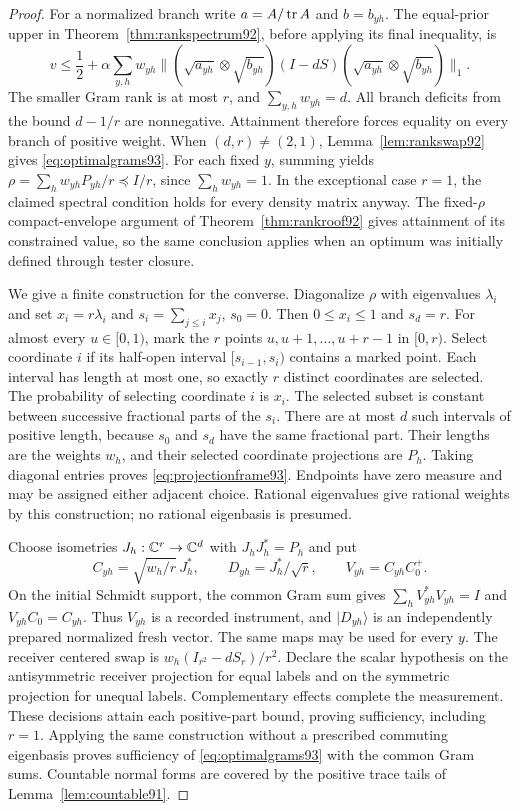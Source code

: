 \begin{proof}
For a normalized branch write $a=A/\operatorname{tr} A$ and $b=b_{yh}$.
The equal-prior upper in Theorem~\ref{thm:rankspectrum92}, before
applying its final inequality, is
\begin{equation}\label{eq:unsaturatedrankupper93}
 v\le\frac12+\alpha\sum_{y,h}w_{yh}
       \| (\sqrt{a_{yh}}\otimes\sqrt{b_{yh}})(I-dS)
                    (\sqrt{a_{yh}}\otimes\sqrt{b_{yh}})\|_1.
\end{equation}
The smaller Gram rank is at most $r$, and $\sum_{y,h}w_{yh}=d$.
All branch deficits from the bound $d-1/r$ are nonnegative.
Attainment therefore forces equality on every branch of positive
weight.  When $(d,r)\ne(2,1)$, Lemma~\ref{lem:rankswap92} gives
\eqref{eq:optimalgrams93}.  For each fixed $y$, summing yields
$\rho=\sum_hw_{yh}P_{yh}/r\preceq I/r$, since
$\sum_hw_{yh}=1$.  In the exceptional case $r=1$, the claimed spectral
condition holds for every density matrix anyway.  The fixed-$\rho$
compact-envelope argument of Theorem~\ref{thm:rankroof92} gives
attainment of its constrained value, so the same conclusion applies
when an optimum was initially defined through tester closure.

We give a finite construction for the converse.  Diagonalize $\rho$
with eigenvalues $\lambda_i$ and set $x_i=r\lambda_i$ and
$s_i=\sum_{j\le i}x_j$, $s_0=0$.  Then $0\le x_i\le1$ and
$s_d=r$.  For almost every $u\in[0,1)$, mark the $r$ points
$u,u+1,\ldots,u+r-1$ in $[0,r)$.  Select coordinate $i$ if its
half-open interval $[s_{i-1},s_i)$ contains a marked point.
Each interval has length at most one, so exactly $r$ distinct
coordinates are selected.  The probability of selecting coordinate
$i$ is $x_i$.  The selected subset is constant between successive
fractional parts of the $s_i$.  There are at most $d$ such intervals
of positive length, because $s_0$ and $s_d$ have the same fractional
part.  Their lengths are the weights $w_h$, and their selected
coordinate projections are $P_h$.  Taking diagonal entries proves
\eqref{eq:projectionframe93}.  Endpoints have zero measure and may
be assigned either adjacent choice.  Rational eigenvalues give rational
weights by this construction; no rational eigenbasis is presumed.

Choose isometries $J_h:\mathbb C^r\to\mathbb C^d$ with $J_hJ_h^*=P_h$ and put
\[
 C_{yh}=\sqrt{w_h/r}\,J_h^*,\qquad
 D_{yh}=J_h^*/\sqrt r,\qquad V_{yh}=C_{yh}C_0^+.
\]
On the initial Schmidt support, the common Gram sum gives
$\sum_hV_{yh}^*V_{yh}=I$ and $V_{yh}C_0=C_{yh}$.
Thus $V_{yh}$ is a recorded instrument, and $|D_{yh}\rangle$ is an
independently prepared normalized fresh vector.  The same maps may be
used for every $y$.  The receiver centered swap is
$w_h(I_{r^2}-dS_r)/r^2$.  Declare the scalar hypothesis on the
antisymmetric receiver projection for equal labels and on the symmetric
projection for unequal labels.  Complementary effects complete the
measurement.  These decisions attain each positive-part bound, proving
sufficiency, including $r=1$.  Applying the same construction without
a prescribed commuting eigenbasis proves sufficiency of
\eqref{eq:optimalgrams93} with the common Gram sums.  Countable
normal forms are covered by the positive trace tails of
Lemma~\ref{lem:countable91}.
\end{proof}
